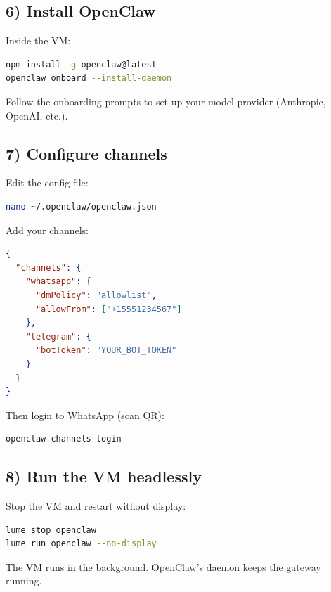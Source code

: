 \subsection{6) Install OpenClaw}


Inside the VM:

\begin{lstlisting}[language=bash]
npm install -g openclaw@latest
openclaw onboard --install-daemon
\end{lstlisting}


Follow the onboarding prompts to set up your model provider (Anthropic, OpenAI, etc.).

\hrulefill


\subsection{7) Configure channels}


Edit the config file:

\begin{lstlisting}[language=bash]
nano ~/.openclaw/openclaw.json
\end{lstlisting}


Add your channels:

\begin{lstlisting}[language=json]
{
  "channels": {
    "whatsapp": {
      "dmPolicy": "allowlist",
      "allowFrom": ["+15551234567"]
    },
    "telegram": {
      "botToken": "YOUR_BOT_TOKEN"
    }
  }
}
\end{lstlisting}


Then login to WhatsApp (scan QR):

\begin{lstlisting}[language=bash]
openclaw channels login
\end{lstlisting}


\hrulefill


\subsection{8) Run the VM headlessly}


Stop the VM and restart without display:

\begin{lstlisting}[language=bash]
lume stop openclaw
lume run openclaw --no-display
\end{lstlisting}


The VM runs in the background. OpenClaw's daemon keeps the gateway running.


